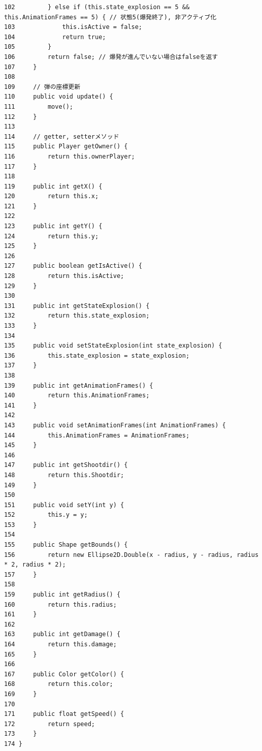 \documentclass[11pt,a4j]{jarticle}
\begin{document}
\begin{small}
\begin{verbatim}
102         } else if (this.state_explosion == 5 && this.AnimationFrames == 5) { // 状態5(爆発終了), 非アクティブ化
103             this.isActive = false;
104             return true;
105         }
106         return false; // 爆発が進んでいない場合はfalseを返す
107     }
108 
109     // 弾の座標更新
110     public void update() {
111         move();
112     }
113 
114     // getter, setterメソッド
115     public Player getOwner() {
116         return this.ownerPlayer;
117     }
118 
119     public int getX() {
120         return this.x;
121     }
122 
123     public int getY() {
124         return this.y;
125     }
126 
127     public boolean getIsActive() {
128         return this.isActive;
129     }
130 
131     public int getStateExplosion() {
132         return this.state_explosion;
133     }
134 
135     public void setStateExplosion(int state_explosion) {
136         this.state_explosion = state_explosion;
137     }
138 
139     public int getAnimationFrames() {
140         return this.AnimationFrames;
141     }
142 
143     public void setAnimationFrames(int AnimationFrames) {
144         this.AnimationFrames = AnimationFrames;
145     }
146 
147     public int getShootdir() {
148         return this.Shootdir;
149     }
150 
151     public void setY(int y) {
152         this.y = y;
153     }
154 
155     public Shape getBounds() {
156         return new Ellipse2D.Double(x - radius, y - radius, radius * 2, radius * 2);
157     }
158 
159     public int getRadius() {
160         return this.radius;
161     }
162 
163     public int getDamage() {
164         return this.damage;
165     }
166 
167     public Color getColor() {
168         return this.color;
169     }
170 
171     public float getSpeed() {
172         return speed;
173     }
174 }
\end{verbatim}
\end{small}
\end{document}
